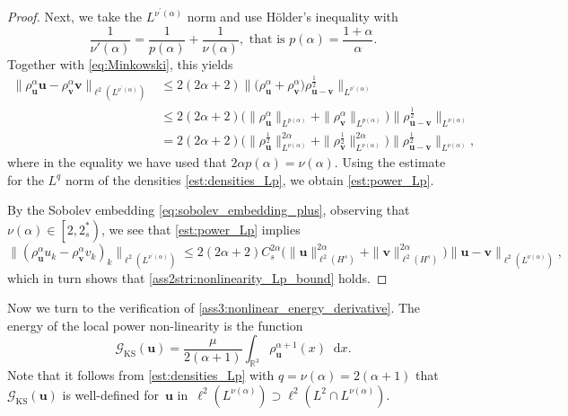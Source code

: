 \documentclass[12pt,a4paper]{amsart}
\numberwithin{equation}{section}
\newcommand{\ulu}{\boldsymbol{u}}
\newcommand{\ulv}{\boldsymbol{v}}
\newcommand*\diff{\mathop{}\!\mathrm{d}}
\newcommand{\twoasts}{{2^*_s}}
\begin{document}
\begin{proof}
		Next, we take the $L^{\nu^\prime(\alpha)} $ norm and use H{\"o}lder's inequality with 
		\begin{equation*}
			\frac1{\nu'(\alpha)} = \frac{1}{p(\alpha)} + \frac1{\nu(\alpha)}, \text{  that is  } p(\alpha) = \frac{1+\alpha}{ \alpha} .
		\end{equation*} 
		Together with \eqref{eq:Minkowski}, this yields
		\begin{align*}
			\big\| \rho_{\ulu}^\alpha \ulu - \rho_{\ulv}^\alpha  \ulv \big\|_{\ell^2(L^{\nu^\prime(\alpha)})} & \leq 2(2\alpha+2)\| \big( \rho_{{\ulu}}^\alpha  + \rho_{{\ulv}}^\alpha  \big) \rho_{{\ulu}-{\ulv}}^{\frac{1}{2}}  \|_{L^{\nu^\prime(\alpha)}}   \\
			& \leq
			2(2\alpha+2)  \big( \| \rho_{{\ulu}}^\alpha  \|_{L^{p(\alpha)}} +  \| \rho_{{\ulv}}^\alpha  \|_{L^{p(\alpha)}} \big) \| \rho_{{\ulu}-{\ulv}}^{\frac{1}{2}}  \|_{L^{\nu(\alpha)}}\\
			& =
			2(2\alpha+2)  \big( \| \rho_{{\ulu}}^\frac12  \|_{L^{\nu(\alpha)}}^{2\alpha} +  \| \rho_{{\ulv}}^\frac12  \|_{L^{\nu(\alpha)}}^{2\alpha} \big) \| \rho_{{\ulu}-{\ulv}}^{\frac{1}{2}}  \|_{L^{\nu(\alpha)}},
		\end{align*} 
		where in the equality we have used that $2\alpha p(\alpha)=\nu(\alpha)$.
		Using the estimate for the $L^q$ norm of the densities \eqref{est:densities_Lp}, we obtain \eqref{est:power_Lp}. 
		
		By the Sobolev embedding \eqref{eq:sobolev_embedding_plus}, observing that $ \nu(\alpha) \in \left[ 2 , \twoasts  \right) $, we see that \eqref{est:power_Lp} implies
		\begin{equation}
			\label{est:power_Hs}
			\big\| (\rho_{\ulu}^\alpha u_k - \rho_{\ulv}^\alpha v_k )_k \big\|_{\ell^2(L^{\nu^\prime(\alpha)})} \leq 2(2\alpha+2)  C_s^{2 \alpha} \big( \| {\ulu} \|_{\ell^2(H^s)}^{2\alpha} + \| {\ulv} \|_{\ell^2(H^s)}^{2\alpha} \big) \| {\ulu} - {\ulv} \|_{\ell^2(L^{\nu(\alpha)})},
		\end{equation}
		which in turn shows that \ref{ass2stri:nonlinearity_Lp_bound} holds.
	\end{proof}
	
	Now we turn to the verification of \ref{ass3:nonlinear_energy_derivative}. The energy of the local power non-linearity is the function
	\begin{equation}
		\mathscr{G}_{\mathrm{KS}}(\ulu) = \frac{\mu}{2(\alpha+1)} \int_{\mathbb{R}^3} \rho_{\ulu}^{\alpha +1} (x) \diff  x .
	\end{equation}
	Note that it follows from \eqref{est:densities_Lp} with $q=\nu(\alpha)=2(\alpha+1)$ that $\mathscr{G}_{\mathrm{KS}}(\ulu)$ is well-defined for~$\ulu$ in~$\ell^2(L^{\nu(\alpha)})\supset \ell^2(L^2\cap L^{\nu(\alpha)})$. 
	
\end{document}
